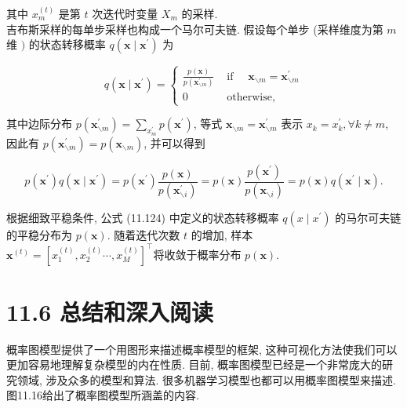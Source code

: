 \documentclass[10pt]{article}
\begin{document}
其中 $x_{m}^{(t)}$ 是第 $t$ 次迭代时变量 $X_{m}$ 的采样.\\
吉布斯采样的每单步采样也构成一个马尔可夫链. 假设每个单步 (采样维度为第 $m$ 维 $)$ 的状态转移概率 $q\left(\boldsymbol{x} \mid \boldsymbol{x}^{\prime}\right)$ 为

\[
q\left(\boldsymbol{x} \mid \boldsymbol{x}^{\prime}\right)=\left\{\begin{array}{cl}
\frac{p(\boldsymbol{x})}{p\left(\boldsymbol{x}_{\backslash m}^{\prime}\right)} & \text { if } \quad \boldsymbol{x}_{\backslash m}=\boldsymbol{x}_{\backslash m}^{\prime}  \tag{11.124}\\
0 & \text { otherwise, }
\end{array}\right.
\]

其中边际分布 $p\left(\boldsymbol{x}_{\backslash m}^{\prime}\right)=\sum_{x_{m}^{\prime}} p\left(\boldsymbol{x}^{\prime}\right)$, 等式 $\boldsymbol{x}_{\backslash m}=\boldsymbol{x}_{\backslash m}^{\prime}$ 表示 $x_{k}=x_{k}^{\prime}, \forall k \neq m$, 因此有 $p\left(\boldsymbol{x}_{\backslash m}^{\prime}\right)=p\left(\boldsymbol{x}_{\backslash m}\right)$, 并可以得到


\begin{equation*}
p\left(\boldsymbol{x}^{\prime}\right) q\left(\boldsymbol{x} \mid \boldsymbol{x}^{\prime}\right)=p\left(\boldsymbol{x}^{\prime}\right) \frac{p(\boldsymbol{x})}{p\left(\boldsymbol{x}_{\backslash i}^{\prime}\right)}=p(\boldsymbol{x}) \frac{p\left(\boldsymbol{x}^{\prime}\right)}{p\left(\boldsymbol{x}_{\backslash i}\right)}=p(\boldsymbol{x}) q\left(\boldsymbol{x}^{\prime} \mid \boldsymbol{x}\right) . \tag{11.125}
\end{equation*}


根据细致平稳条件, 公式 (11.124) 中定义的状态转移概率 $q\left(x \mid x^{\prime}\right)$ 的马尔可夫链的平稳分布为 $p(\boldsymbol{x})$. 随着迭代次数 $t$ 的增加, 样本 $\boldsymbol{x}^{(t)}=\left[x_{1}^{(t)}, x_{2}^{(t)} \cdots, x_{M}^{(t)}\right]^{\top}$将收敛于概率分布 $p(\boldsymbol{x})$.

\section*{11.6 总结和深入阅读}
概率图模型提供了一个用图形来描述概率模型的框架, 这种可视化方法使我们可以更加容易地理解复杂模型的内在性质. 目前, 概率图模型已经是一个非常庞大的研究领域, 涉及众多的模型和算法. 很多机器学习模型也都可以用概率图模型来描述. 图11.16给出了概率图模型所涵盖的内容.
\end{document}
